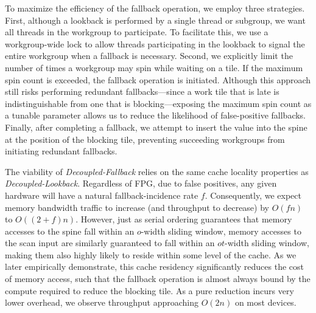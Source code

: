 \documentclass[sigconf]{acmart}
\begin{document}
To maximize the efficiency of the fallback operation, we employ three strategies. First, although a lookback is performed by a single thread or subgroup, we want all threads in the workgroup to participate. To facilitate this, we use a workgroup-wide lock to allow threads participating in the lookback to signal the entire workgroup when a fallback is necessary. Second, we explicitly limit the number of times a workgroup may spin while waiting on a tile. If the maximum spin count is exceeded, the fallback operation is initiated. Although this approach still risks performing redundant fallbacks---since a work tile that is late is indistinguishable from one that is blocking---exposing the maximum spin count as a tunable parameter allows us to reduce the likelihood of false-positive fallbacks. Finally, after completing a fallback, we attempt to insert the value into the spine at the position of the blocking tile, preventing succeeding workgroups from initiating redundant fallbacks.

The viability of \emph{Decoupled-Fallback} relies on the same cache locality properties as \emph{Decoupled-Lookback}. Regardless of FPG, due to false positives, any given hardware will have a natural fallback-incidence rate $f$. Consequently, we expect memory bandwidth traffic to increase (and throughput to decrease) by $O(fn)$ to $O((2 + f)n)$. However, just as serial ordering guarantees that memory accesses to the spine fall within an $o$-width sliding window, memory accesses to the scan input are similarly guaranteed to fall within an $ot$-width sliding window, making them also highly likely to reside within some level of the cache. As we later empirically demonstrate, this cache residency significantly reduces the cost of memory access, such that the fallback operation is almost always bound by the compute required to reduce the blocking tile. As a pure reduction incurs very lower overhead, we observe throughput approaching $O(2n)$ on most devices.
\end{document}
